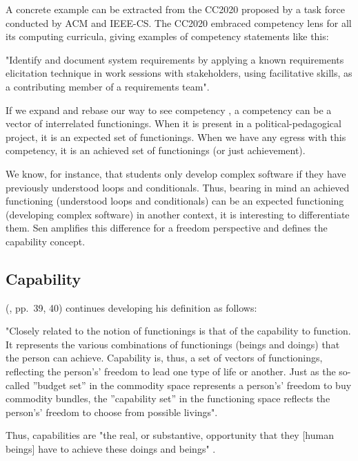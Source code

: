A concrete example can be extracted from the \gls{CC2020} proposed by a task force conducted by \gls{ACM} and \gls{IEEE-CS}. The \gls{CC2020} \cite[p.~52]{acm:2020} embraced competency lens for all its computing curricula, giving examples of competency statements like this:  
\begin{citacao}
    "Identify and document system requirements by applying a known requirements elicitation technique in work sessions with stakeholders, using facilitative skills, as a contributing member of a requirements team".  
\end{citacao}
If we expand and rebase our way to see competency \cite{lozano:2012}, a competency can be a vector of interrelated functionings. When it is present in a political-pedagogical project, it is an expected set of functionings. When we have any egress with this competency, it is an achieved set of functionings (or just achievement).

We know, for instance, that students only develop complex software if they have previously understood loops and conditionals. Thus, bearing in mind an achieved functioning (understood loops and conditionals) can be an expected functioning (developing complex software) in another context, it is interesting to differentiate them. Sen amplifies this difference for a freedom perspective and defines the capability concept.

\subsection{Capability}
\label{sen-ss:capability}

 (\citeyear{sen:1992}, pp.~39, 40) continues developing his definition as follows:
\begin{citacao}
    "Closely related to the notion of functionings is that of the capability to function. It represents the various combinations of functionings (beings and doings) that the person can achieve. Capability is, thus, a set of vectors of functionings, reflecting the person's' freedom to lead one type of life or another. Just as the so-called ''budget set'' in the commodity space represents a person's' freedom to buy commodity bundles, the ''capability set'' in the functioning space reflects the person's' freedom to choose from possible livings".    
\end{citacao}
Thus, capabilities are "the real, or substantive, opportunity that they [human beings] have to achieve these doings and beings" \cite{robeyns:2023}.

